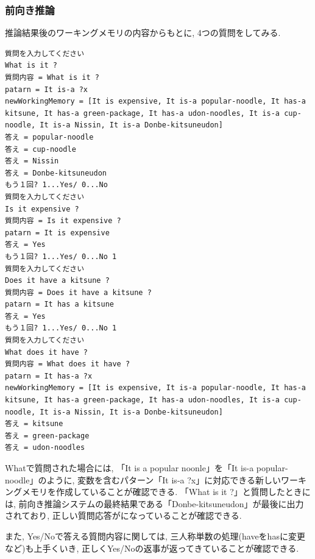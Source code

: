 \documentclass[uplatex,12pt]{jsarticle}
\begin{document}
\subsubsection{前向き推論}
推論結果後のワーキングメモリの内容からもとに, 4つの質問をしてみる.
\begin{lstlisting}
質問を入力してください
What is it ?
質問内容 = What is it ?
patarn = It is-a ?x
newWorkingMemory = [It is expensive, It is-a popular-noodle, It has-a kitsune, It has-a green-package, It has-a udon-noodles, It is-a cup-noodle, It is-a Nissin, It is-a Donbe-kitsuneudon]
答え = popular-noodle
答え = cup-noodle
答え = Nissin
答え = Donbe-kitsuneudon
もう１回? 1...Yes/ 0...No 
質問を入力してください
Is it expensive ?
質問内容 = Is it expensive ?
patarn = It is expensive
答え = Yes
もう１回? 1...Yes/ 0...No 1
質問を入力してください
Does it have a kitsune ?
質問内容 = Does it have a kitsune ?
patarn = It has a kitsune
答え = Yes
もう１回? 1...Yes/ 0...No 1
質問を入力してください
What does it have ?
質問内容 = What does it have ?
patarn = It has-a ?x
newWorkingMemory = [It is expensive, It is-a popular-noodle, It has-a kitsune, It has-a green-package, It has-a udon-noodles, It is-a cup-noodle, It is-a Nissin, It is-a Donbe-kitsuneudon]
答え = kitsune
答え = green-package
答え = udon-noodles
\end{lstlisting}

Whatで質問された場合には, 「It is a popular noonle」を「It is-a popular-noodle」のように, 変数を含むパターン「It is-a ?x」に対応できる新しいワーキングメモリを作成していることが確認できる. 「What is it ?」と質問したときには, 前向き推論システムの最終結果である「Donbe-kitsuneudon」が最後に出力されており, 正しい質問応答がになっていることが確認できる.

また, Yes/Noで答える質問内容に関しては, 三人称単数の処理(haveをhasに変更など)も上手くいき, 正しくYes/Noの返事が返ってきていることが確認できる.
\end{document}
